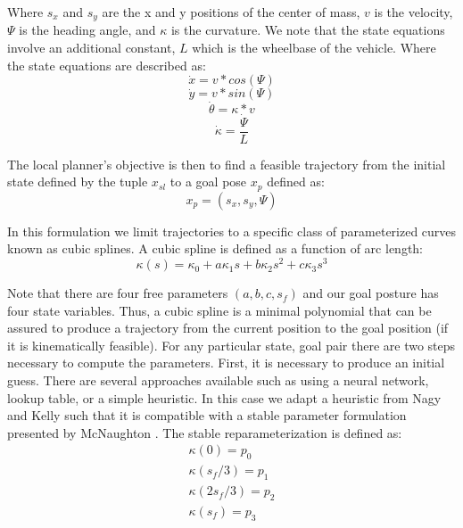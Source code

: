 Where $s_x$ and $s_y$ are the x and y positions of the center of mass, $v$ is the velocity, $\Psi$ is the heading angle, and $\kappa$ is the curvature. We note that the state equations involve an additional constant, $L$ which is the wheelbase of the vehicle.
Where the state equations are described as:
\begin{equation}
	\dot{x}= v*cos(\Psi)
\end{equation}
\begin{equation}
	\dot{y} = v*sin(\Psi)
\end{equation}
\begin{equation}
	\dot{\theta}= \kappa*v
\end{equation}
\begin{equation}
	\dot{\kappa} = \frac{\dot{\Psi}}{L}
\end{equation}

The local planner's objective is then to find a feasible trajectory from the initial state defined by the tuple $x_{sl}$ to a goal pose $x_{p}$ defined as:
\begin{equation}
	x_{p} = (s_x,s_y,\Psi)
\end{equation}

In this formulation we limit trajectories to a specific class of parameterized curves known as cubic splines. A cubic spline is defined as a function of arc length:
\begin{equation}
	\kappa(s) = \kappa_0 + a \kappa_1 s + b \kappa_2 s^2 + c \kappa_3 s^3
\end{equation}

Note that there are four free parameters $(a,b,c,s_f)$ and our goal posture has four state variables. Thus, a cubic spline is a minimal polynomial that can be assured to produce a trajectory from the current position to the goal position (if it is kinematically feasible). For any particular state, goal pair there are two steps necessary to compute the parameters. First, it is necessary to produce an initial guess. There are several approaches available such as using a neural network, lookup table, or a simple heuristic. In this case we adapt a heuristic from Nagy and Kelly \cite{nagy2001trajectory} such that it is compatible with a stable parameter formulation presented by McNaughton \cite{McNaughton_2011_6927}. The stable reparameterization is defined as:
\begin{gather}
	\kappa(0)=p_0\\
	\kappa(s_f/3)=p_1\\
	\kappa(2s_f/3)=p_2\\
	\kappa(s_f)=p_3
\end{gather}

